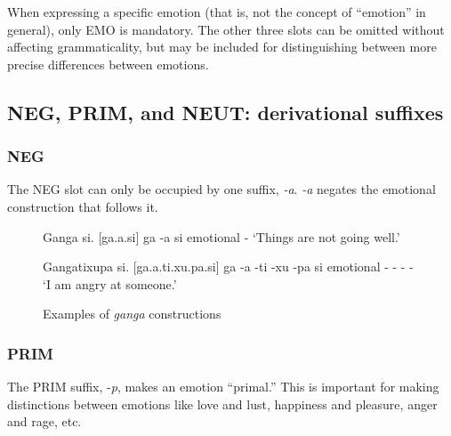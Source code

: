 				When expressing a specific emotion (that is, not the concept of ``emotion'' in general), only EMO is mandatory. The other three slots can be omitted without affecting grammaticality, but may be included for distinguishing between more precise differences between emotions.

	\subsection{NEG, PRIM, and NEUT: derivational suffixes}
		\subsubsection{NEG}
			The NEG slot can only be occupied by one suffix, \emph{-\N a}. \emph{-\N a} negates the emotional construction that follows it.

			\begin{figure}[H] %
			\label{interlin_emo_neg}

				\begin{example}
				\label{ex:interlin_emo_neg_1}
					Ganga si. [\stress ga.\N a.si]
					\gll ga -\N a si
					emotional -{\negative} \cop
					\glt `Things are not going well.'
					\glend
				\end{example}

				\begin{example}
				\label{ex:interlin_emo_neg_2}
					Gangatixupa si. [ga.\stress\N a.ti.xu.pa.si]
					\gll ga -\N a -ti -xu -pa si
					emotional -{\negative} - - -\D{dur:short} \cop
					\glt `I am angry at someone.'
					\glend
				\end{example}

			\caption{Examples of \emph{ganga} constructions}
			\end{figure}

		\subsubsection{PRIM}
			The PRIM suffix, -\emph{p\OO}, makes an emotion ``primal.'' This is important for making distinctions between emotions like love and lust, happiness and pleasure, anger and rage, etc.

